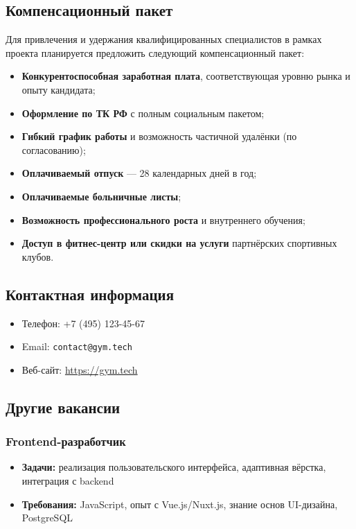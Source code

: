\documentclass[14pt, russian]{matmex-diploma-custom}
\begin{document}
\subsection{Компенсационный пакет}
Для привлечения и удержания квалифицированных специалистов в рамках проекта планируется предложить следующий компенсационный пакет:

\begin{itemize}
    \item \textbf{Конкурентоспособная заработная плата}, соответствующая уровню рынка и опыту кандидата;
    \item \textbf{Оформление по ТК РФ} с полным социальным пакетом;
    \item \textbf{Гибкий график работы} и возможность частичной удалёнки (по согласованию);
    \item \textbf{Оплачиваемый отпуск} — 28 календарных дней в год;
    \item \textbf{Оплачиваемые больничные листы};
    \item \textbf{Возможность профессионального роста} и внутреннего обучения;
    \item \textbf{Доступ в фитнес-центр или скидки на услуги} партнёрских спортивных клубов.
\end{itemize}

\subsection{Контактная информация}
\begin{itemize}
  \item Телефон: +7 (495) 123-45-67
  \item Email: \texttt{contact@gym.tech}
  \item Веб-сайт: \url{https://gym.tech}
\end{itemize}

\subsection{Другие вакансии}

\subsubsection{Frontend-разработчик}
\begin{itemize}
  \item \textbf{Задачи:} реализация пользовательского интерфейса, адаптивная вёрстка, интеграция с backend
  \item \textbf{Требования:} JavaScript, опыт с Vue.js/Nuxt.js, знание основ UI-дизайна, PostgreSQL
\end{itemize}
\end{document}
